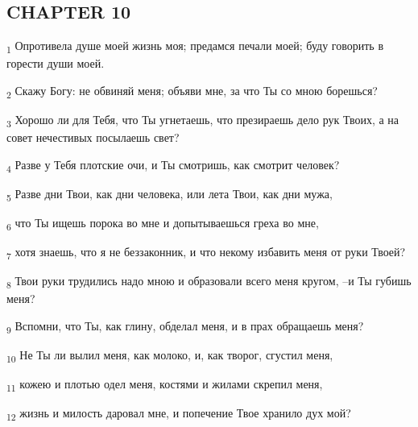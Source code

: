 \subsection{CHAPTER 10}
\begin{tcolorbox}
\textsubscript{1} Опротивела душе моей жизнь моя; предамся печали моей; буду говорить в горести души моей.
\end{tcolorbox}
\begin{tcolorbox}
\textsubscript{2} Скажу Богу: не обвиняй меня; объяви мне, за что Ты со мною борешься?
\end{tcolorbox}
\begin{tcolorbox}
\textsubscript{3} Хорошо ли для Тебя, что Ты угнетаешь, что презираешь дело рук Твоих, а на совет нечестивых посылаешь свет?
\end{tcolorbox}
\begin{tcolorbox}
\textsubscript{4} Разве у Тебя плотские очи, и Ты смотришь, как смотрит человек?
\end{tcolorbox}
\begin{tcolorbox}
\textsubscript{5} Разве дни Твои, как дни человека, или лета Твои, как дни мужа,
\end{tcolorbox}
\begin{tcolorbox}
\textsubscript{6} что Ты ищешь порока во мне и допытываешься греха во мне,
\end{tcolorbox}
\begin{tcolorbox}
\textsubscript{7} хотя знаешь, что я не беззаконник, и что некому избавить меня от руки Твоей?
\end{tcolorbox}
\begin{tcolorbox}
\textsubscript{8} Твои руки трудились надо мною и образовали всего меня кругом, --и Ты губишь меня?
\end{tcolorbox}
\begin{tcolorbox}
\textsubscript{9} Вспомни, что Ты, как глину, обделал меня, и в прах обращаешь меня?
\end{tcolorbox}
\begin{tcolorbox}
\textsubscript{10} Не Ты ли вылил меня, как молоко, и, как творог, сгустил меня,
\end{tcolorbox}
\begin{tcolorbox}
\textsubscript{11} кожею и плотью одел меня, костями и жилами скрепил меня,
\end{tcolorbox}
\begin{tcolorbox}
\textsubscript{12} жизнь и милость даровал мне, и попечение Твое хранило дух мой?
\end{tcolorbox}

